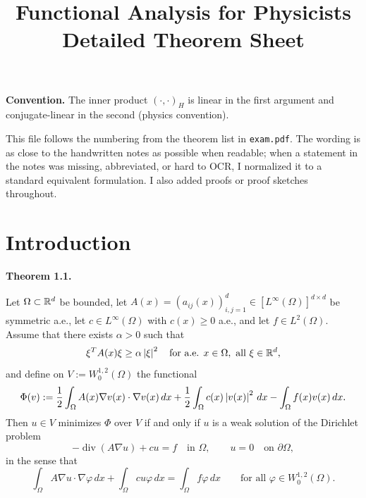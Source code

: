 \documentclass[11pt]{article}
\title{Functional Analysis for Physicists\\Detailed Theorem Sheet}
\author{}
\date{}
\newenvironment{theoremstmt}[1]{%
  \par\medskip\noindent\textbf{Theorem #1. }\itshape
}{\par\medskip}
\begin{document}
\maketitle

\textbf{Convention.} The inner product $(\cdot,\cdot)_H$ is linear in the first argument and conjugate-linear in the second (physics convention).

This file follows the numbering from the theorem list in \texttt{exam.pdf}. The wording is as close to the handwritten notes as possible when readable; when a statement in the notes was missing, abbreviated, or hard to OCR, I normalized it to a standard equivalent formulation. I also added proofs or proof sketches throughout.

\tableofcontents
\clearpage

\section{Introduction}

\begin{theoremstmt}{1.1}
Let $\Omega\subset\mathbb{R}^d$ be bounded, let $A(x)=(a_{ij}(x))_{i,j=1}^d\in [L^\infty(\Omega)]^{d\times d}$ be symmetric a.e., let $c\in L^\infty(\Omega)$ with $c(x)\ge 0$ a.e., and let $f\in L^2(\Omega)$. Assume that there exists $\alpha>0$ such that
\[
\xi^T A(x) \xi \ge \alpha \left\lvert \xi\right\rvert^2 \quad \text{for a.e. }x\in\Omega,\ \text{all }\xi\in\mathbb{R}^d,
\]
and define on $V:=W^{1,2}_0(\Omega)$ the functional
\[
\Phi(v):=\frac12 \int_{\Omega} A(x)\nabla v(x)\cdot \nabla v(x)\,dx
+\frac12\int_{\Omega} c(x)\left\lvert v(x)\right\rvert^2\,dx
-\int_{\Omega} f(x)v(x)\,dx.
\]
Then $u\in V$ minimizes $\Phi$ over $V$ if and only if $u$ is a weak solution of the Dirichlet problem
\[
-\operatorname{div}(A\nabla u)+cu=f \quad \text{in }\Omega,
\qquad
u=0 \quad \text{on }\partial\Omega,
\]
in the sense that
\[
\int_{\Omega} A\nabla u\cdot \nabla \varphi\,dx
+\int_{\Omega} cu\varphi\,dx
=\int_{\Omega} f\varphi\,dx
\qquad\text{for all }\varphi\in W^{1,2}_0(\Omega).
\]
\end{theoremstmt}
\end{document}
